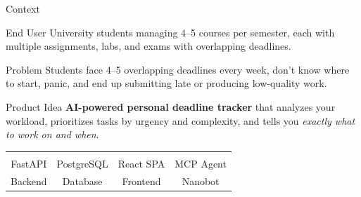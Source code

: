 \documentclass[10pt,aspectratio=169]{beamer}
\begin{document}
{
\begin{frame}{Context}
    \vspace{4pt}

    \begin{block}{End User}
        University students managing 4--5 courses per semester, each with multiple assignments, labs, and exams with overlapping deadlines.
    \end{block}

    \begin{alertblock}{Problem}
        Students face 4--5 overlapping deadlines every week, don't know where to start, panic, and end up submitting late or producing low-quality work.
    \end{alertblock}

    \begin{block}{Product Idea}
        \textbf{AI-powered personal deadline tracker} that analyzes your workload, prioritizes tasks by urgency and complexity, and tells you \emph{exactly what to work on and when}.
    \end{block}

    \vspace{6pt}
    \begin{center}
        \setlength{\tabcolsep}{10pt}
        \renewcommand{\arraystretch}{1.2}
        \begin{tabular}{c c c c}
            \raisebox{-1pt}{\textcolor{deepblue}{\Huge $\langle/\rangle$}} &
            \raisebox{-1pt}{\textcolor{accentgreen}{\Huge $\dblozenge$}} &
            \raisebox{-1pt}{\textcolor{accentblue}{\Huge $\boxplus$}} &
            \raisebox{-1pt}{\textcolor{accentorange}{\Huge $\odot$}} \\[4pt]
            FastAPI & PostgreSQL & React SPA & MCP Agent \\
            Backend & Database & Frontend & Nanobot
        \end{tabular}
    \end{center}
\end{frame}
}
\end{document}
